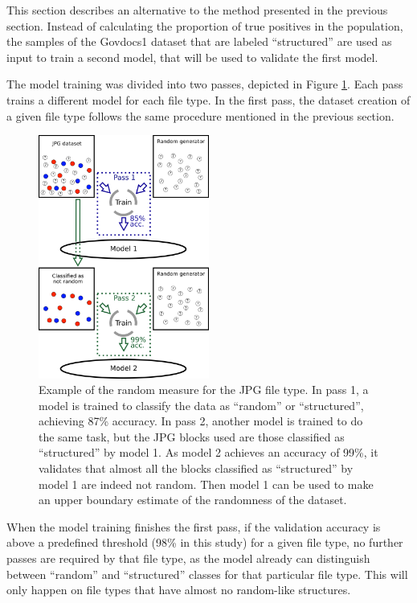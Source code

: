 This section describes an alternative to the method presented in the previous section. Instead of calculating the proportion of true positives in the population, the samples of the Govdocs1 dataset that are labeled ``structured'' are used as input to train a second model, that will be used to validate the first model.

The model training was divided into two passes, depicted in Figure \ref{fig:randommeasure}. Each pass trains a different model for each file type. In the first pass, the dataset creation of a given file type follows the same procedure mentioned in the previous section.

\noindent
\begin{figure}[htb!]
\centering\includegraphics[width=0.5\textwidth]{content/random_measure.png}
\caption{\label{fig:randommeasure}Example of the random measure for the JPG file type. In pass 1, a model is trained to classify the data as ``random'' or ``structured'', achieving 87\% accuracy. In pass 2, another model is trained to do the same task, but the JPG blocks used are those classified as ``structured'' by model 1. As model 2 achieves an accuracy of 99\%, it validates that almost all the blocks classified as ``structured'' by model 1 are indeed not random. Then model 1 can be used to make an upper boundary estimate of the randomness of the dataset.}%
\end{figure}

When the model training finishes the first pass, if the validation accuracy is above a predefined threshold (98\% in this study) for a given file type, no further passes are required by that file type, as the model already can distinguish between ``random'' and ``structured'' classes for that particular file type. This will only happen on file types that have almost no random-like structures.

